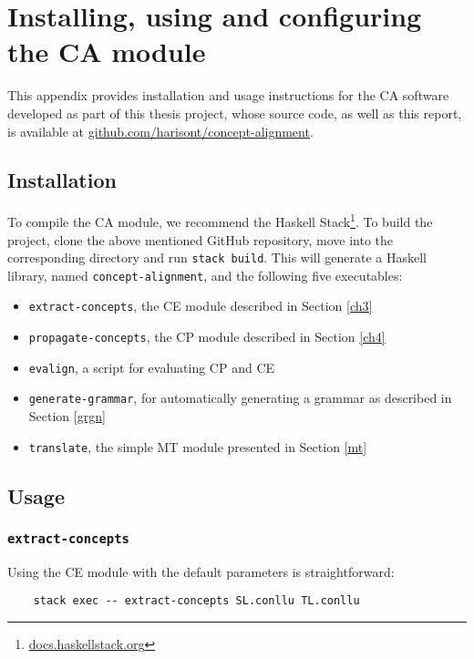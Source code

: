 \chapter{Installing, using and configuring the CA module} \label{b}
This appendix provides installation and usage instructions for the CA software developed as part of this thesis project, whose source code, as well as this report, is available at \url{github.com/harisont/concept-alignment}.

\section{Installation}
To compile the CA module, we recommend the Haskell Stack\footnote{\url{docs.haskellstack.org}}. 
To build the project, clone the above mentioned GitHub repository, move into the corresponding directory and run \texttt{stack build}. 
This will generate a Haskell library, named \texttt{concept-alignment}, and the following five executables: \smallskip

\begin{itemize}
    \item \texttt{extract-concepts}, the CE module described in Section \ref{ch3}
    \item \texttt{propagate-concepts}, the CP module described in Section \ref{ch4}
    \item \texttt{evalign}, a script for evaluating CP and CE
    \item \texttt{generate-grammar}, for automatically generating a grammar as described in Section \ref{grgn}
    \item \texttt{translate}, the simple MT module presented in Section \ref{mt}
\end{itemize}

\section{Usage}
\subsection{\texttt{extract-concepts}}
Using the CE module with the default parameters is straightforward: \smallskip

\begin{verbatim}
    stack exec -- extract-concepts SL.conllu TL.conllu
\end{verbatim} \smallskip

